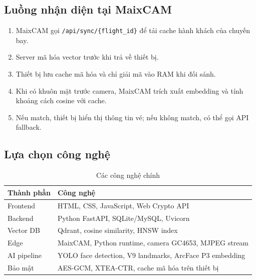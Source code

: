 \subsection{Luồng nhận diện tại MaixCAM}
\begin{enumerate}
  \item MaixCAM gọi \texttt{/api/sync/\{flight\_id\}} để tải cache hành khách của chuyến bay.
  \item Server mã hóa vector trước khi trả về thiết bị.
  \item Thiết bị lưu cache mã hóa và chỉ giải mã vào RAM khi đối sánh.
  \item Khi có khuôn mặt trước camera, MaixCAM trích xuất embedding và tính khoảng cách cosine với cache.
  \item Nếu match, thiết bị hiển thị thông tin vé; nếu không match, có thể gọi API fallback.
\end{enumerate}

\subsection{Lựa chọn công nghệ}
\begin{table}[H]
  \centering
  \caption{Các công nghệ chính}
  \begin{tabularx}{\textwidth}{lX}
    \toprule
    \textbf{Thành phần} & \textbf{Công nghệ} \\
    \midrule
    Frontend & HTML, CSS, JavaScript, Web Crypto API \\
    Backend & Python FastAPI, SQLite/MySQL, Uvicorn \\
    Vector DB & Qdrant, cosine similarity, HNSW index \\
    Edge & MaixCAM, Python runtime, camera GC4653, MJPEG stream \\
    AI pipeline & YOLO face detection, V9 landmarks, ArcFace P3 embedding \\
    Bảo mật & AES-GCM, XTEA-CTR, cache mã hóa trên thiết bị \\
    \bottomrule
  \end{tabularx}
\end{table}
